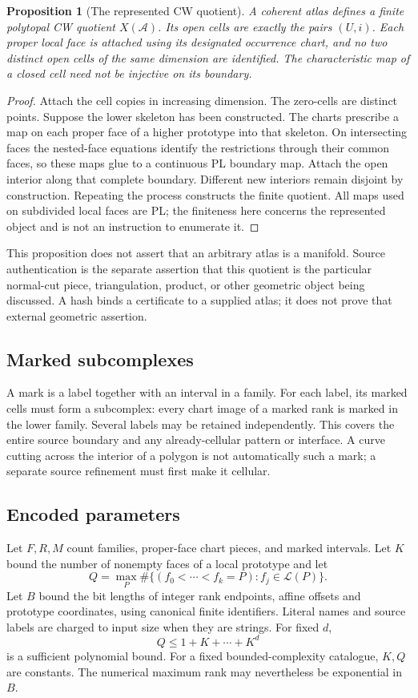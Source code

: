 \documentclass[11pt]{article}
\newtheorem{proposition}[theorem]{Proposition}
\theoremstyle{definition}\newtheorem{definition}[theorem]{Definition}
\theoremstyle{remark}\newtheorem{remark}[theorem]{Remark}
\newcommand{\faceposet}{\mathcal L}
\newcommand{\Atlas}{\mathcal A}
\begin{document}
\begin{proposition}[The represented CW quotient]\label{prop:quotient}
A coherent atlas defines a finite polytopal CW quotient \(X(\Atlas)\). Its open cells are exactly the pairs \((U,i)\). Each proper local face is attached using its designated occurrence chart, and no two distinct open cells of the same dimension are identified. The characteristic map of a closed cell need not be injective on its boundary.
\end{proposition}
\begin{proof}
Attach the cell copies in increasing dimension. The zero-cells are distinct points. Suppose the lower skeleton has been constructed. The charts prescribe a map on each proper face of a higher prototype into that skeleton. On intersecting faces the nested-face equations identify the restrictions through their common faces, so these maps glue to a continuous PL boundary map. Attach the open interior along that complete boundary. Different new interiors remain disjoint by construction. Repeating the process constructs the finite quotient. All maps used on subdivided local faces are PL; the finiteness here concerns the represented object and is not an instruction to enumerate it.
\end{proof}

This proposition does not assert that an arbitrary atlas is a manifold. Source authentication is the separate assertion that this quotient is the particular normal-cut piece, triangulation, product, or other geometric object being discussed. A hash binds a certificate to a supplied atlas; it does not prove that external geometric assertion.

\subsection{Marked subcomplexes}
A mark is a label together with an interval in a family. For each label, its marked cells must form a subcomplex: every chart image of a marked rank is marked in the lower family. Several labels may be retained independently. This covers the entire source boundary and any already-cellular pattern or interface. A curve cutting across the interior of a polygon is not automatically such a mark; a separate source refinement must first make it cellular.

\subsection{Encoded parameters}
Let \(F,R,M\) count families, proper-face chart pieces, and marked intervals. Let \(K\) bound the number of nonempty faces of a local prototype and let
\[
 Q=\max_P\#\{(f_0<\cdots<f_k=P):f_j\in\faceposet(P)\}.
\]
Let \(B\) bound the bit lengths of integer rank endpoints, affine offsets and prototype coordinates, using canonical finite identifiers. Literal names and source labels are charged to input size when they are strings. For fixed \(d\),
\[
                   Q\leq 1+K+\cdots+K^d
\]
is a sufficient polynomial bound. For a fixed bounded-complexity catalogue, \(K,Q\) are constants. The numerical maximum rank may nevertheless be exponential in \(B\).
\end{document}
